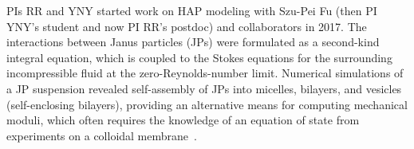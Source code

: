 %
%
PIs RR and YNY started work on HAP modeling with Szu-Pei Fu (then PI
YNY's student and now PI RR's postdoc) and collaborators in 2017. The
interactions between Janus particles (JPs) were formulated as a
second-kind integral equation, which is coupled to the Stokes equations
for the surrounding incompressible fluid at the zero-Reynolds-number
limit. Numerical simulations of a JP suspension revealed self-assembly
of JPs into micelles, bilayers, and vesicles (self-enclosing bilayers),
providing an alternative means for computing mechanical moduli, which
often requires the knowledge of an equation of state from experiments on
a colloidal membrane~\cite{Balchunas2019_SM}.

